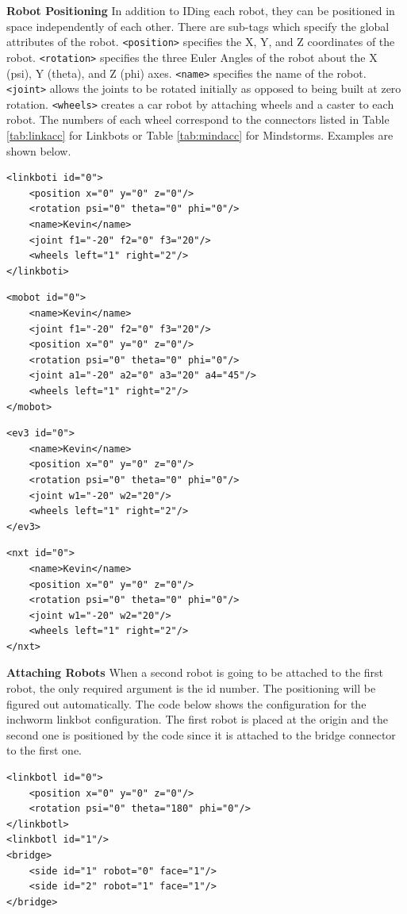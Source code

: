 \documentclass{article}
\begin{document}
\noindent
\newline
\textbf{Robot Positioning}
\newline
In addition to IDing each robot, they can be positioned in space independently
of each other.  There are sub-tags which specify the global attributes of the
robot.  \texttt{<position>} specifies the X, Y, and Z coordinates of the robot.
\texttt{<rotation>} specifies the three Euler Angles of the robot about the X
(psi), Y (theta), and Z (phi) axes.  \texttt{<name>} specifies the name of the
robot.  \texttt{<joint>} allows the joints to be rotated initially as opposed to
being built at zero rotation.  \texttt{<wheels>} creates a car robot by
attaching wheels and a caster to each robot.  The numbers of each wheel
correspond to the connectors listed in Table \ref{tab:linkacc} for Linkbots or
Table \ref{tab:mindacc} for Mindstorms.  Examples are shown below.
\begin{verbatim}
<linkboti id="0">
    <position x="0" y="0" z="0"/>
    <rotation psi="0" theta="0" phi="0"/>
	<name>Kevin</name>
    <joint f1="-20" f2="0" f3="20"/>
	<wheels left="1" right="2"/>
</linkboti>
\end{verbatim}
\begin{verbatim}
<mobot id="0">
	<name>Kevin</name>
    <joint f1="-20" f2="0" f3="20"/>
    <position x="0" y="0" z="0"/>
    <rotation psi="0" theta="0" phi="0"/>
    <joint a1="-20" a2="0" a3="20" a4="45"/>
	<wheels left="1" right="2"/>
</mobot>
\end{verbatim}
\begin{verbatim}
<ev3 id="0">
	<name>Kevin</name>
    <position x="0" y="0" z="0"/>
    <rotation psi="0" theta="0" phi="0"/>
    <joint w1="-20" w2="20"/>
	<wheels left="1" right="2"/>
</ev3>
\end{verbatim}
\begin{verbatim}
<nxt id="0">
	<name>Kevin</name>
    <position x="0" y="0" z="0"/>
    <rotation psi="0" theta="0" phi="0"/>
    <joint w1="-20" w2="20"/>
	<wheels left="1" right="2"/>
</nxt>
\end{verbatim}

\noindent
\newline
\textbf{Attaching Robots}
\newline
When a second robot is going to be attached to the first robot, the only
required argument is the id number.  The positioning will be figured out
automatically.  The code below shows the configuration for the inchworm linkbot
configuration.  The first robot is placed at the origin and the second one is
positioned by the code since it is attached to the bridge connector to the first
one.
\begin{verbatim}
<linkbotl id="0">
    <position x="0" y="0" z="0"/>
    <rotation psi="0" theta="180" phi="0"/>
</linkbotl>
<linkbotl id="1"/>
<bridge>
    <side id="1" robot="0" face="1"/>
    <side id="2" robot="1" face="1"/>
</bridge>
\end{verbatim}
\end{document}
